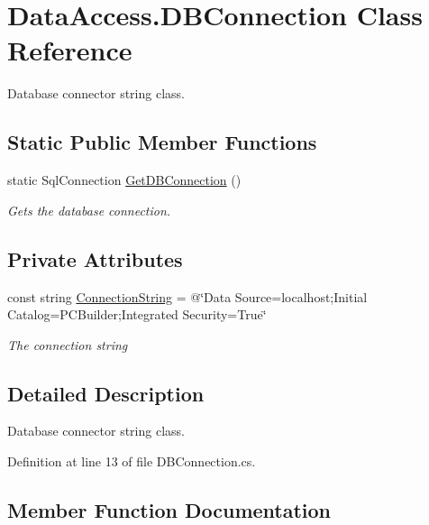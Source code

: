 \hypertarget{class_data_access_1_1_d_b_connection}{}\section{Data\+Access.\+D\+B\+Connection Class Reference}
\label{class_data_access_1_1_d_b_connection}


Database connector string class.  


\subsection*{Static Public Member Functions}
\begin{DoxyCompactItemize}
\item 
static Sql\+Connection \hyperlink{class_data_access_1_1_d_b_connection_acb22adf9b3f24c80a2b81ec2d1919718}{Get\+D\+B\+Connection} ()
\begin{DoxyCompactList}\small\item\em Gets the database connection. \end{DoxyCompactList}\end{DoxyCompactItemize}
\subsection*{Private Attributes}
\begin{DoxyCompactItemize}
\item 
const string \hyperlink{class_data_access_1_1_d_b_connection_ada2203b451d5a83a7e566970443846ea}{Connection\+String} = @\char`\"{}Data Source=localhost;Initial Catalog=P\+C\+Builder;Integrated Security=True\char`\"{}
\begin{DoxyCompactList}\small\item\em The connection string \end{DoxyCompactList}\end{DoxyCompactItemize}


\subsection{Detailed Description}
Database connector string class. 



Definition at line 13 of file D\+B\+Connection.\+cs.



\subsection{Member Function Documentation}
